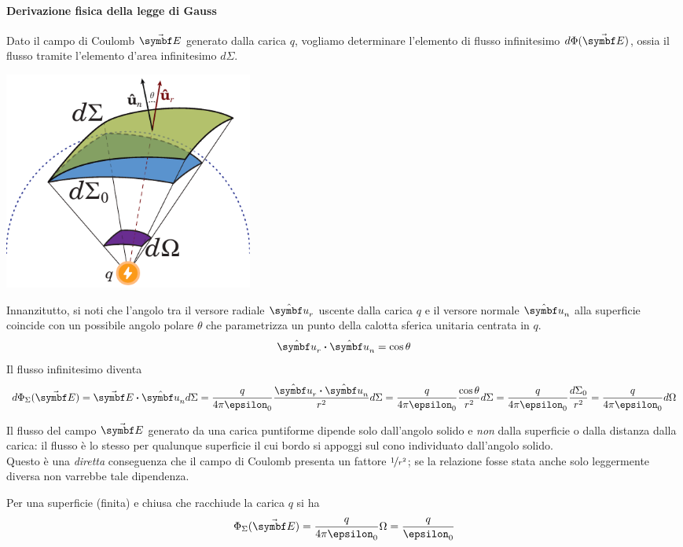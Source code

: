 \paragraph{Derivazione fisica della legge di Gauss}
Dato il campo di Coulomb $\vba{E}$ generato dalla carica $q$, vogliamo determinare l'elemento di flusso infinitesimo $d\Phi(\vba{E})$, ossia il flusso tramite l'elemento d'area infinitesimo $d\Sigma$.
\begin{center}
	\includegraphics[width=0.36\textwidth]{images/chp2/chp2flussodim1.pdf}
\end{center}
Innanzitutto, si noti che l'angolo tra il versore radiale $\vbh{u}_r$ uscente dalla carica $q$ e il versore normale $\vbh{u}_n$ alla superficie coincide con un possibile angolo polare $\theta$ che parametrizza un punto della calotta sferica unitaria centrata in $q$.
\begin{equation*}
\vbh{u}_r\vdot\vbh{u}_n=\cos\theta
\end{equation*}
Il flusso infinitesimo diventa
\begin{equation*}
	d\Phi_{\Sigma}(\vba{E})=\vba{E}\vdot\vbh{u}_nd\Sigma=\frac{q}{4\pi\epsilon_0}\frac{\vbh{u}_r\vdot\vbh{u}_n}{r^2}d\Sigma=\frac{q}{4\pi\epsilon_0}\frac{\cos\theta}{r^2}d\Sigma=\frac{q}{4\pi\epsilon_0}\frac{d\Sigma_0}{r^2}=\frac{q}{4\pi\epsilon_0}d\Omega
\end{equation*}
\begin{observe}
	Il flusso del campo $\vba{E}$ generato da una carica puntiforme dipende solo dall'angolo solido e \textit{non} dalla superficie o dalla distanza dalla carica: il flusso è lo stesso per qualunque superficie il cui bordo si appoggi sul cono individuato dall'angolo solido.\\
	Questo è una \textit{diretta} conseguenza che il campo di Coulomb presenta un fattore $\nicefrac{1}{r^2}$; se la relazione fosse stata anche solo leggermente diversa non varrebbe tale dipendenza.
\end{observe}
Per una superficie (finita) e chiusa che racchiude la carica $q$ si ha
 \begin{equation*}
 	\Phi_\Sigma(\vba{E})=\frac{q}{4\pi\epsilon_0}\Omega=\frac{q}{\epsilon_0}
 \end{equation*}
